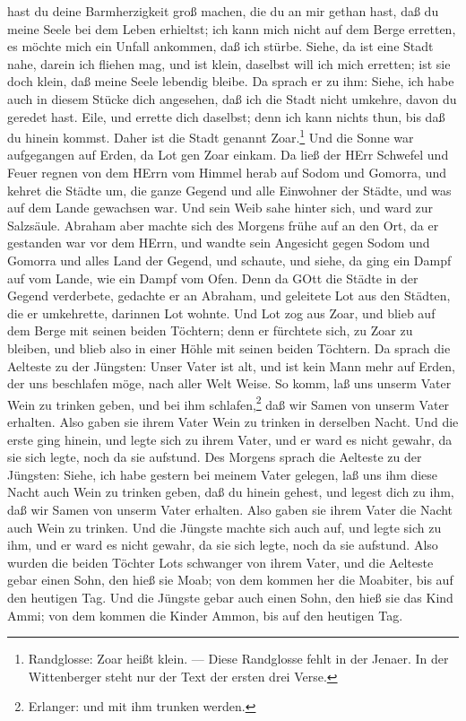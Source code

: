 \begin{schriftzitat}
hast du deine Barmherzigkeit groß machen, die du an mir gethan hast, daß du meine Seele bei dem Leben erhieltst; ich kann mich nicht auf dem Berge erretten, es möchte mich ein Unfall ankommen, daß ich stürbe. Siehe, da ist eine Stadt nahe, darein ich fliehen mag, und ist klein, daselbst will ich mich erretten; ist sie doch klein, daß meine Seele lebendig bleibe. Da sprach er zu ihm: Siehe, ich habe auch in diesem Stücke dich angesehen, daß ich die Stadt nicht umkehre, davon du geredet hast. Eile, und errette dich daselbst; denn ich kann nichts thun, bis daß du hinein kommst. Daher ist die Stadt genannt Zoar.\footnote{Randglosse: Zoar heißt klein. — Diese Randglosse fehlt in der Jenaer. In der Wittenberger steht nur der Text der ersten drei Verse.} Und die Sonne war aufgegangen auf Erden, da Lot gen Zoar einkam. Da ließ der HErr Schwefel und Feuer regnen von dem HErrn vom Himmel herab auf Sodom und Gomorra, und kehret die Städte um, die ganze Gegend und alle Einwohner der Städte, und was auf dem Lande gewachsen war. Und sein Weib sahe hinter sich, und ward zur Salzsäule. Abraham aber machte sich des Morgens frühe auf an den Ort, da er gestanden war vor dem HErrn, und wandte sein Angesicht gegen Sodom und Gomorra und alles Land der Gegend, und schaute, und siehe, da ging ein Dampf auf vom Lande, wie ein Dampf vom Ofen. Denn da GOtt die Städte in der Gegend verderbete, gedachte er an Abraham, und geleitete Lot aus den Städten, die er umkehrette, darinnen Lot wohnte. Und Lot zog aus Zoar, und blieb auf dem Berge mit seinen beiden Töchtern; denn er fürchtete sich, zu Zoar zu bleiben, und blieb also in einer Höhle mit seinen beiden Töchtern. Da sprach die Aelteste zu der Jüngsten: Unser Vater ist alt, und ist kein Mann mehr auf Erden, der uns beschlafen möge, nach aller Welt Weise. So komm, laß uns unserm Vater Wein zu trinken geben, und bei ihm schlafen,\footnote{Erlanger: und mit ihm trunken werden.} daß wir Samen von unserm Vater erhalten. Also gaben sie ihrem Vater Wein zu trinken in derselben Nacht. Und die erste ging hinein, und legte sich zu ihrem Vater, und er ward es nicht gewahr, da sie sich legte, noch da sie aufstund. Des Morgens sprach die Aelteste zu der Jüngsten: Siehe, ich habe gestern bei meinem Vater gelegen, laß uns ihm diese Nacht auch Wein zu trinken geben, daß du hinein gehest, und legest dich zu ihm, daß wir Samen von unserm Vater erhalten. Also gaben sie ihrem Vater die Nacht auch Wein zu trinken. Und die Jüngste machte sich auch auf, und legte sich zu ihm, und er ward es nicht gewahr, da sie sich legte, noch da sie aufstund. Also wurden die beiden Töchter Lots schwanger von ihrem Vater, und die Aelteste gebar einen Sohn, den hieß sie Moab; von dem kommen her die Moabiter, bis auf den heutigen Tag. Und die Jüngste gebar auch einen Sohn, den hieß sie das Kind Ammi; von dem kommen die Kinder Ammon, bis auf den heutigen Tag.
\end{schriftzitat}



